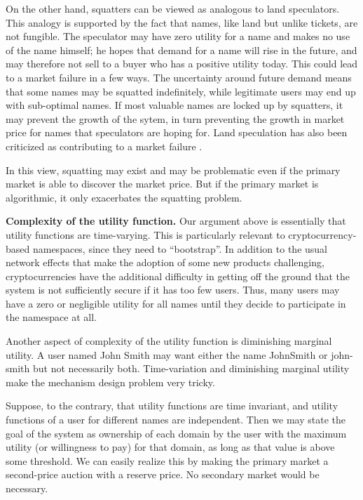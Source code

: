 On the other hand, squatters can be viewed as analogous to land speculators. This analogy is supported by the fact that names, like land but unlike tickets, are not fungible. The speculator may have zero utility for a name and makes no use of the name himself; he hopes that demand for a name will rise in the future, and may therefore not sell to a buyer who has a positive utility today. This could lead to a market failure in a few ways. The uncertainty around future demand means that some names may be squatted indefinitely, while legitimate users may end up with sub-optimal names. If most valuable names are locked up by squatters, it may prevent the growth of the sytem, in turn preventing the growth in market price for names that speculators are hoping for. Land speculation has also been criticized as contributing to a market failure \cite{ottensmann1977urban}. 


In this view, squatting may exist and may be problematic even if the primary market is able to discover the market price. But if the primary market is algorithmic, it only exacerbates the squatting problem.


{\bf Complexity of the utility function.} 
Our argument above is essentially that utility functions are time-varying. This is particularly relevant to cryptocurrency-based namespaces, since they need to ``bootstrap''. In addition to the usual network effects that make the adoption of some new products challenging, cryptocurrencies have the additional difficulty in getting off the ground that the system is not sufficiently secure if it has too few users. Thus, many users may have a zero or negligible utility for all names until they decide to participate in the namespace at all.

Another aspect of complexity of the utility function is diminishing marginal utility. A user named John Smith may want either the name \textsf{JohnSmith} or \textsf{john-smith} but not necessarily both. Time-variation and diminishing marginal utility make the mechanism design problem very tricky.

Suppose, to the contrary, that utility functions are time invariant, and utility functions of a user for different names are independent. Then we may state the goal of the system as ownership of each domain by the user with the maximum utility (or willingness to pay) for that domain, as long as that value is above some threshold. We can easily realize this by making the primary market a second-price auction with a reserve price. No secondary market would be necessary.

